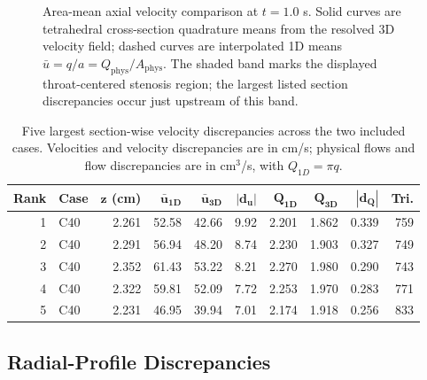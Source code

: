 \begin{figure}[H]
    \centering
    \captionsetup{aboveskip=2pt,belowskip=2pt}
    \caption{Area-mean axial velocity comparison at $t=1.0$ s. Solid curves are
    tetrahedral cross-section quadrature means from the resolved 3D velocity
    field; dashed curves are interpolated 1D means
    $\bar u=q/a=Q_{\mathrm{phys}}/A_{\mathrm{phys}}$. The shaded band marks the
    displayed throat-centered stenosis region; the largest listed section
    discrepancies occur just upstream of this band.}
    \label{fig:t1-section-mean-comparison}
\end{figure}

\begin{table}[!htb]
    \centering
    \scriptsize
    \caption{Five largest section-wise velocity discrepancies across the two
    included cases. Velocities and velocity discrepancies are in cm/s; physical
    flows and flow discrepancies are in cm$^3$/s, with $Q_{1D}=\pi q$.}
    \label{tab:t1-largest-section-discrepancies}
    \begin{tabular}{@{}rlrrrrrrrr@{}}
        \toprule
        \textbf{Rank}
            & \textbf{Case}
            & $\boldsymbol{z}$ \textbf{(cm)}
            & $\boldsymbol{\bar u_{1D}}$
            & $\boldsymbol{\bar u_{3D}}$
            & $\boldsymbol{|d_u|}$
            & $\boldsymbol{Q_{1D}}$
            & $\boldsymbol{Q_{3D}}$
            & $\boldsymbol{|d_Q|}$
            & \textbf{Tri.} \\
        \midrule
        1 & C40 & 2.261 & 52.58 & 42.66 & 9.92 & 2.201 & 1.862 & 0.339 & 759 \\
        2 & C40 & 2.291 & 56.94 & 48.20 & 8.74 & 2.230 & 1.903 & 0.327 & 749 \\
        3 & C40 & 2.352 & 61.43 & 53.22 & 8.21 & 2.270 & 1.980 & 0.290 & 743 \\
        4 & C40 & 2.322 & 59.81 & 52.09 & 7.72 & 2.253 & 1.970 & 0.283 & 771 \\
        5 & C40 & 2.231 & 46.95 & 39.94 & 7.01 & 2.174 & 1.918 & 0.256 & 833 \\
        \bottomrule
    \end{tabular}
\end{table}

\subsection{Radial-Profile Discrepancies}
\label{subsec:reconstructed-radial-profile-results}

